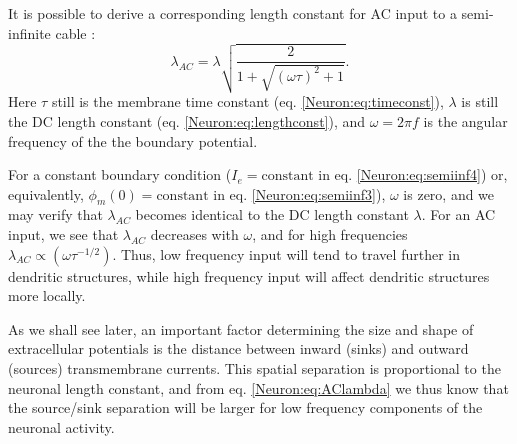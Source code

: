 It is possible to derive a corresponding length constant for AC input to a semi-infinite cable \cite{Pettersen2008a}: 
\begin{equation}
\lambda_{AC} = \lambda \sqrt{ \frac{2}{1+\sqrt{(\omega \tau)^2 + 1}} }.
\label{Neuron:eq:AClambda}
\end{equation}
Here $\tau$ still is the membrane time constant (eq. \ref{Neuron:eq:timeconst}), $\lambda$ is still the DC length constant (eq. \ref{Neuron:eq:lengthconst}), and $\omega = 2\pi f$ is the angular frequency of the the boundary potential.

For a constant boundary condition ($I_e = \text{constant}$ in eq. \ref{Neuron:eq:semiinf4}) or, equivalently, $\phi_m(0) = \text{constant}$ in eq. \ref{Neuron:eq:semiinf3}), $\omega$ is zero, and we may verify that $\lambda_{AC}$ becomes identical to the DC length constant $\lambda$. For an AC input, we see that $\lambda_{AC}$ decreases with $\omega$, and for high frequencies $\lambda_{AC} \propto (\omega \tau^{-1/2})$. Thus, low frequency input will tend to travel further in dendritic structures, while high frequency input will affect dendritic structures more locally. 

As we shall see later, an important factor determining the size and shape of extracellular potentials is the distance between inward (sinks) and outward (sources) transmembrane currents. This spatial separation is proportional to the neuronal length constant, and from eq. \ref{Neuron:eq:AClambda} we thus know that the source/sink separation will be larger for low frequency components of the neuronal activity.


